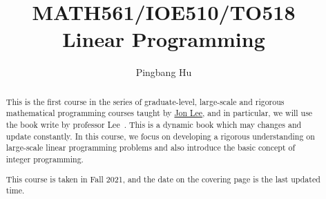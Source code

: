 \documentclass[a4paper]{report}
\author{Pingbang Hu}
\title{MATH561/IOE510/TO518\\Linear Programming}
\begin{document}
\maketitle

\begin{abstract}
	This is the first course in the series of graduate-level, large-scale and rigorous mathematical programming courses taught by \href{https://sites.google.com/site/jonleewebpage/}{Jon Lee}, and in particular, we will use the book write by professor Lee~\cite{Linear-Opt}. This is a dynamic book which may changes and update constantly. In this course, we focus on developing a rigorous understanding on large-scale linear programming problems and also introduce the basic concept of integer programming.

	\vfill
	This course is taken in Fall 2021, and the date on the covering page is the last updated time.
\end{abstract}

\tableofcontents

\newpage


\newpage
\appendix
\appendixpage



\newpage
\printbibliography
\end{document}
